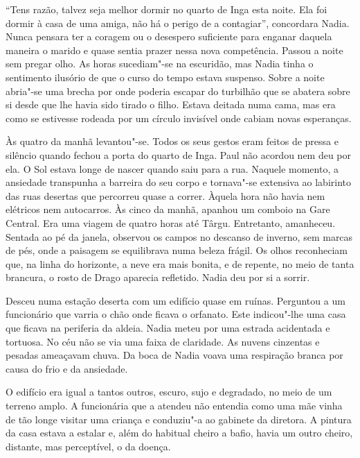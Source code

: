 ``Tens razão, talvez seja melhor dormir no quarto de Inga esta noite. Ela
foi dormir à casa de uma amiga, não há o perigo de a contagiar'',
concordara Nadia. Nunca pensara ter a coragem ou o desespero suficiente
para enganar daquela maneira o marido e quase sentia prazer nessa nova
competência. Passou a noite sem pregar olho. As horas sucediam"-se na
escuridão, mas Nadia tinha o sentimento ilusório de que o curso do tempo
estava suspenso. Sobre a noite abria"-se uma brecha por onde poderia
escapar do turbilhão que se abatera sobre si desde que lhe havia sido
tirado o filho. Estava deitada numa cama, mas era como se estivesse
rodeada por um círculo invisível onde cabiam novas esperanças.

Às quatro da manhã levantou"-se. Todos os seus gestos eram feitos de
pressa e silêncio quando fechou a porta do quarto de Inga. Paul não
acordou nem deu por ela. O Sol estava longe de nascer quando saiu para a
rua. Naquele momento, a ansiedade transpunha a barreira do seu corpo e
tornava"-se extensiva ao labirinto das ruas desertas que percorreu quase
a correr. Àquela hora não havia nem
elétricos nem autocarros. Às cinco da manhã, apanhou um comboio na Gare
Central. Era uma viagem de quatro horas até Târgu. Entretanto,
amanheceu. Sentada ao pé da janela, observou os campos no descanso de
inverno, sem marcas de pés, onde a paisagem se equilibrava numa beleza
frágil. Os olhos reconheciam que, na linha do horizonte, a neve era
mais bonita, e de repente, no meio de tanta brancura, o rosto de Drago
aparecia refletido. Nadia deu por si a sorrir.

Desceu numa estação deserta com um edifício quase em ruínas. Perguntou a
um funcionário que varria o chão onde ficava o orfanato. Este
indicou"-lhe uma casa que ficava na periferia da aldeia. Nadia meteu por
uma estrada acidentada e tortuosa. No céu não se via uma faixa de
claridade. As nuvens cinzentas e pesadas ameaçavam chuva. Da boca de
Nadia voava uma respiração branca por causa do frio e da ansiedade.

\bigskip

O edifício era igual a tantos outros, escuro, sujo e degradado, no
meio de um terreno amplo. A funcionária que a atendeu não entendia como
uma mãe vinha de tão longe visitar uma criança e conduziu"-a ao gabinete
da diretora. A pintura da casa estava a estalar e, além do habitual
cheiro a bafio, havia um outro cheiro, distante, mas perceptível, o da
doença.

